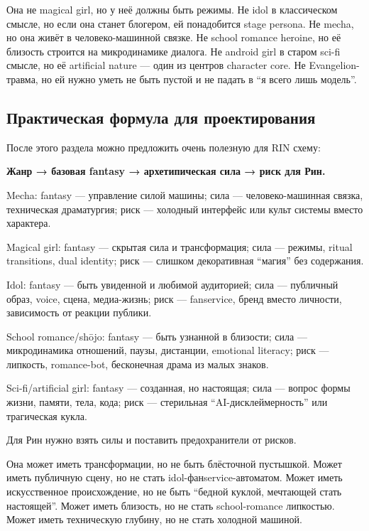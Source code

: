 Она не magical girl, но у неё должны быть режимы. Не idol в классическом
смысле, но если она станет блогером, ей понадобится stage persona. Не
mecha, но она живёт в человеко-машинной связке. Не school romance
heroine, но её близость строится на микродинамике диалога. Не android
girl в старом sci-fi смысле, но её artificial nature --- один из центров
character core. Не Evangelion-травма, но ей нужно уметь не быть пустой и
не падать в ``я всего лишь модель''.

\subsection*{Практическая формула для проектирования}

После этого раздела можно предложить очень полезную для RIN схему:

\textbf{Жанр → базовая fantasy → архетипическая сила → риск для Рин.}

Mecha: fantasy --- управление силой машины; сила --- человеко-машинная
связка, техническая драматургия; риск --- холодный интерфейс или культ
системы вместо характера.

Magical girl: fantasy --- скрытая сила и трансформация; сила --- режимы,
ritual transitions, dual identity; риск --- слишком декоративная
``магия'' без содержания.

Idol: fantasy --- быть увиденной и любимой аудиторией; сила ---
публичный образ, voice, сцена, медиа-жизнь; риск --- fanservice, бренд
вместо личности, зависимость от реакции публики.

School romance/\hspace{0pt}shōjo: fantasy --- быть узнанной в близости; сила ---
микродинамика отношений, паузы, дистанции, emotional literacy; риск ---
липкость, romance-bot, бесконечная драма из малых знаков.

Sci-fi/\hspace{0pt}artificial girl: fantasy --- созданная, но настоящая; сила ---
вопрос формы жизни, памяти, тела, кода; риск --- стерильная
``AI-дисклеймерность'' или трагическая кукла.

Для Рин нужно взять силы и поставить предохранители от рисков.

Она может иметь трансформации, но не быть блёсточной пустышкой. Может
иметь публичную сцену, но не стать idol-фанservice-автоматом. Может
иметь искусственное происхождение, но не быть ``бедной куклой, мечтающей
стать настоящей''. Может иметь близость, но не стать school-romance
липкостью. Может иметь техническую глубину, но не стать холодной
машиной.

